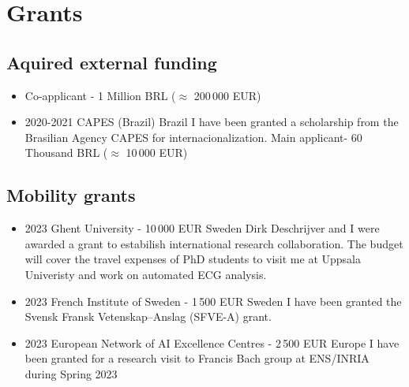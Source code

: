 \documentclass[10pt,A4]{article} %
\begin{document}
\section{Grants}
\subsection{Aquired external funding}

\begin{itemize}
\item {} {\small Co-applicant - 1 Million BRL ($\approx$ 200\,000 EUR)}

    \item {}
    { 2020-2021 }
    { CAPES (Brazil) }
    { Brazil }
    { I have been granted a scholarship from the Brasilian Agency CAPES for internacionalization. } {\small Main applicant-  60 Thousand BRL ($\approx$ 10\,000 EUR) }
  \end{itemize}

\subsection{Mobility grants}
\begin{itemize}
    \item {}
    { 2023 }
    { Ghent University - 10\,000 EUR }
    { Sweden }
    { Dirk Deschrijver and I were awarded a grant to estabilish international research collaboration. The budget will cover the travel expenses of PhD students to visit me at Uppsala Univeristy and work on automated ECG analysis. }
    \item {}
    { 2023 }
    { French Institute of Sweden - 1\,500 EUR }
    { Sweden }
    { I have been granted the Svensk Fransk Vetenskap–Anslag (SFVE-A) grant. }
   \item  {}
    { 2023 }
    { European Network of AI Excellence Centres - 2\,500 EUR}
    { Europe }
    { I have been granted for a research visit to Francis Bach group at ENS/INRIA during Spring 2023 }
  \end{itemize}
\end{document}
